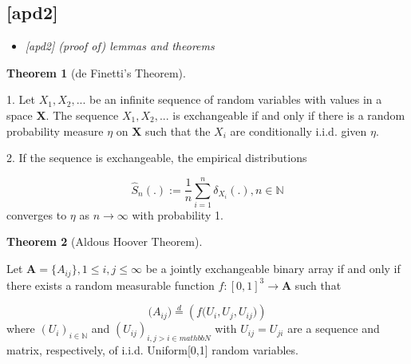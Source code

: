 \documentclass[12pt]{article}
\theoremstyle{definition}
\newtheorem{theorem}{Theorem}[section]
\begin{document}
\subsection{[apd2]}
\begin{itemize}
	\item {\it  [apd2] (proof of) lemmas and theorems   \/}
\end{itemize}


\begin{theorem}[de Finetti's Theorem] 
\label{finetti}

1. Let $X_{1}, X_{2}, ...$ be an infinite sequence of random variables with values in a space $\mathbf{X}$. The sequence $X_{1}, X_{2}, ...$ is exchangeable if and only if there is a random probability measure $\eta$ on $\mathbf{X}$ such that the $X_{i}$ are conditionally i.i.d. given $\eta$. 

2. If the sequence is exchangeable, the empirical distributions

$$\hat{S}_{n} ( . ) := \frac{1}{n} \sum\limits_{i=1}^{n} \delta_{X_{i}} ( .), n \in \mathbb{N}$$
converges to $\eta$ as $n \rightarrow \infty$ with probability 1.
\end{theorem}

\begin{theorem}[Aldous Hoover Theorem]
	\label{Aldous_Hoover}

Let $\mathbf{A} = \{A_{ij}\}, 1 \leq i,j \leq \infty$ be a jointly exchangeable binary array if and only if there exists a random measurable function $f : [0,1]^{3} \rightarrow \mathbf{A}$ such that 

\begin{equation}
\big(  A_{ij}  \big) \stackrel{d}{=} \left( f \big( U_{i}, U_{j}, U_{ij} \big)  \right)
\end{equation}
where $(U_{i})_{i \in \mathbb{N}}$ and $(U_{ij})_{i,j > i \in mathbb{N}}$ with $U_{ij} = U_{ji}$ are a sequence and matrix, respectively, of i.i.d. Uniform[0,1] random variables. 
\end{theorem}
\end{document}
